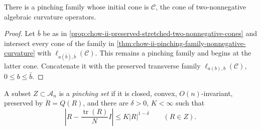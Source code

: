 \begin{corollary}
  \label{cor:chow-ii-pinching-family-two-nonnegative}
  There is a pinching family whose initial cone is \(\mathcal C\), the cone of
  two-nonnegative algebraic curvature operators.
\end{corollary}
\begin{proof}
  Let \(\bar b\) be as in
  \ref{prop:chow-ii-preserved-stretched-two-nonnegative-cones} and intersect
  every cone of the family in
  \ref{thm:chow-ii-pinching-family-nonnegative-curvature} with
  \(\ell_{a(\bar b),\bar b}(\mathcal C)\).  This remains a pinching family and
  begins at the latter cone.  Concatenate it with the preserved transverse
  family \(\ell_{a(b),b}(\mathcal C)\), \(0\le b\le\bar b\).
\end{proof}

\begin{definition}
  \label{def:chow-ii-pinching-set}
  A subset \(Z\subset\mathcal A_n\) is a \emph{pinching set} if it is closed,
  convex, \(O(n)\)-invariant, preserved by \(\dot R=Q(R)\), and there are
  \(\delta>0\), \(K<\infty\) such that
  \[
    \left|R-\frac{\operatorname{tr}(R)}N I\right|
       \le K|R|^{1-\delta}\qquad(R\in Z).
  \]
\end{definition}

